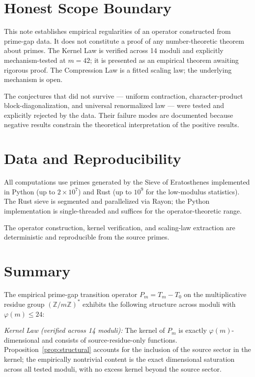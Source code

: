 \documentclass[11pt,a4paper]{article}
\begin{document}
\section{Honest Scope Boundary}

This note establishes empirical regularities of an operator constructed from prime-gap data. It does not constitute a proof of any number-theoretic theorem about primes. The Kernel Law is verified across 14 moduli and explicitly mechanism-tested at $m = 42$; it is presented as an empirical theorem awaiting rigorous proof. The Compression Law is a fitted scaling law; the underlying mechanism is open.

The conjectures that did not survive — uniform contraction, character-product block-diagonalization, and universal renormalized law — were tested and explicitly rejected by the data. Their failure modes are documented because negative results constrain the theoretical interpretation of the positive results.

\section{Data and Reproducibility}

All computations use primes generated by the Sieve of Eratosthenes implemented in Python (up to $2 \times 10^7$) and Rust (up to $10^9$ for the low-modulus statistics). The Rust sieve is segmented and parallelized via Rayon; the Python implementation is single-threaded and suffices for the operator-theoretic range.

The operator construction, kernel verification, and scaling-law extraction are deterministic and reproducible from the source primes.

\section{Summary}

The empirical prime-gap transition operator $P_m = T_m - T_0$ on the multiplicative residue group $(\mathbb{Z}/m\mathbb{Z})^*$ exhibits the following structure across moduli with $\varphi(m) \leq 24$:

\emph{Kernel Law (verified across 14 moduli):} The kernel of $P_m$ is exactly $\varphi(m)$-dimensional and consists of source-residue-only functions. Proposition~\ref{prop:structural} accounts for the inclusion of the source sector in the kernel; the empirically nontrivial content is the exact dimensional saturation across all tested moduli, with no excess kernel beyond the source sector.
\end{document}

